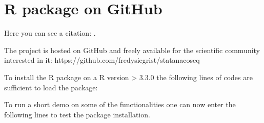 \chapter{R package on GitHub}
Here you can see a citation: \cite{atc2013}.

The project is hosted on GitHub and freely available for the scientific community interested in it:
https://github.com/fredysiegrist/statanacoseq

To install the R package on a R version > 3.3.0 the following lines of codes are sufficient to load the package:

  

To run a short demo on some of the functionalities one can now enter the following lines to test the package installation.

  